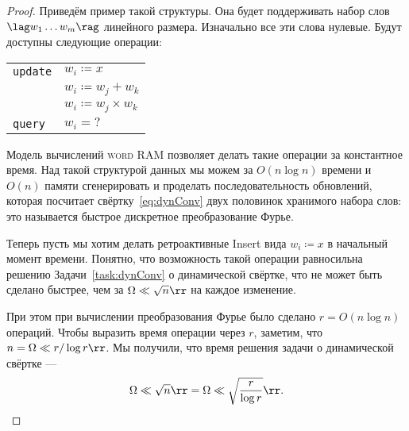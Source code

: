 \begin{proof}
	Приведём пример такой структуры. Она будет поддерживать набор слов $\lag w_1 \ldots w_m \rag$ линейного размера. Изначально все эти слова нулевые. Будут доступны следующие операции:

\begin{center} \begin{tabular}{ll}
	{\tt update} & $w_i \coloneqq x$ \\
		& $w_i \coloneqq w_j + w_k$ \\
		& $w_i \coloneqq w_j \times w_k$ \\
	{\tt query} & $w_i = \text{?}$
\end{tabular} \end{center}

	Модель вычислений {\scshape word RAM} позволяет делать такие операции за константное время. Над такой структурой данных мы можем за $O(n \log n)$ времени и $O(n)$ памяти сгенерировать и проделать последовательность обновлений, которая посчитает свёртку~\eqref{eq:dynConv} двух половинок хранимого набора слов: это называется быстрое дискретное преобразование Фурье.
	
	Теперь пусть мы хотим делать ретроактивные Insert вида $w_i \coloneqq x$ в начальный момент времени. Понятно, что возможность такой операции равносильна решению Задачи~\ref{task:dynConv} о динамической свёртке, что не может быть сделано быстрее, чем за $\Omega \ll \sqrt{n} \rr$ на каждое изменение.
	
	При этом при вычислении преобразования Фурье было сделано $r = O(n \log n)$ операций. Чтобы выразить время операции через $r$, заметим, что $n = \Omega \ll r / \log r \rr$. Мы получили, что время решения задачи о динамической свёртке —
     \begin{equation*}
	\Omega \ll \sqrt{n} \rr = \Omega \ll \sqrt{\frac{r}{\log r}} \rr.
     \end{equation*}
\end{proof}
